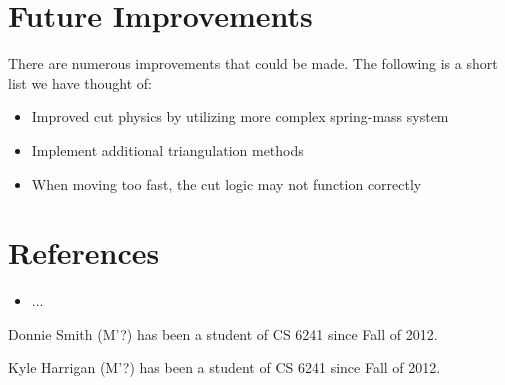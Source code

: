 \documentclass[letterpaper,10pt]{IEEEtran}
\begin{document}
 \section{Future Improvements}
There are numerous improvements that could be made.  The following is a short list we have thought of:

\begin{itemize}
\itemsep0em
\item Improved cut physics by utilizing more complex spring-mass system
\item Implement additional triangulation methods
\item When moving too fast, the cut logic may not function correctly
\end{itemize}
\section{References}
\begin{itemize}
\itemsep0em
\item ...
\end{itemize}

\begin{IEEEbiography}{Donnie Smith} 
(M'?)  has been a student of CS 6241 since Fall of 2012.  
\end{IEEEbiography}
\vspace*{-2\baselineskip}
\begin{IEEEbiography}{Kyle Harrigan} 
(M'?) has been a student of CS 6241 since Fall of 2012.  
\end{IEEEbiography}
\end{document}
